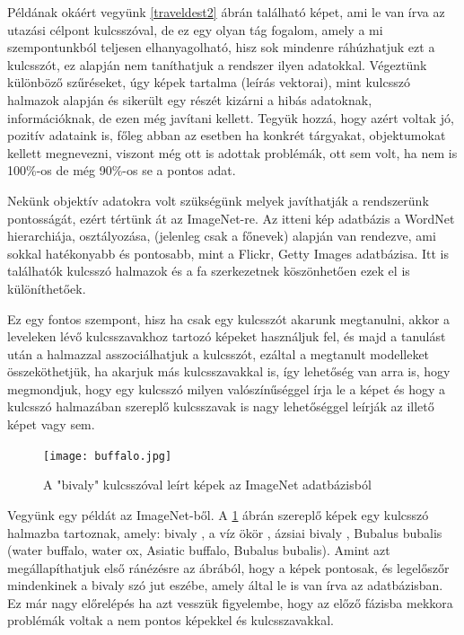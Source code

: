 \documentclass[12pt, a4paper, oneside]{book}
\theoremstyle{tetel}
\begin{document}
	Példának okáért vegyünk \ref{traveldest2} ábrán található képet, ami le van írva az utazási célpont kulcsszóval, de ez egy olyan tág fogalom, amely a mi szempontunkból teljesen elhanyagolható, hisz sok mindenre ráhúzhatjuk ezt a kulcsszót, ez alapján nem taníthatjuk a rendszer ilyen adatokkal. Végeztünk különböző szűréseket, úgy képek tartalma (leírás vektorai), mint kulcsszó halmazok alapján és sikerült egy részét kizárni a hibás adatoknak, információknak, de ezen még javítani kellett. Tegyük hozzá, hogy azért voltak jó, pozitív adataink is, főleg abban az esetben ha konkrét tárgyakat, objektumokat kellett megnevezni, viszont még ott is adottak problémák, ott sem volt, ha nem is 100\%-os de még 90\%-os se a pontos adat.  

	Nekünk objektív adatokra volt szükségünk melyek javíthatják a rendszerünk pontosságát, ezért tértünk át az ImageNet-re\cite{3}. Az itteni kép adatbázis a WordNet \cite{15} hierarchiája, osztályozása, (jelenleg csak a főnevek) alapján van rendezve, ami sokkal hatékonyabb és pontosabb, mint a Flickr\cite{1}, Getty Images\cite{2} adatbázisa. Itt is találhatók kulcsszó halmazok és a fa szerkezetnek köszönhetően ezek el is különíthetőek. 

	Ez egy fontos szempont, hisz ha csak egy kulcsszót akarunk megtanulni, akkor a leveleken lévő kulcsszavakhoz tartozó képeket használjuk fel, és majd a tanulást után a halmazzal asszociálhatjuk a kulcsszót, ezáltal a megtanult modelleket összeköthetjük, ha akarjuk más kulcsszavakkal is, így lehetőség van arra is, hogy megmondjuk, hogy egy kulcsszó milyen valószínűséggel írja le a képet és hogy a kulcsszó halmazában szereplő kulcsszavak is nagy lehetőséggel leírják az illető képet vagy sem.

\vspace{0.4cm}
\begin{figure}[h]
\begin{center}
\texttt{[image: buffalo.jpg]}
\caption{{A "bivaly" kulcsszóval leírt képek az ImageNet\cite{3} adatbázisból}}
\label{buffalo}
\end{center}
\end{figure}

	Vegyünk egy példát az ImageNet-ből\cite{3}. A \ref{buffalo} ábrán szereplő képek egy kulcsszó halmazba tartoznak, amely: bivaly , a víz ökör , ázsiai bivaly , Bubalus bubalis (water buffalo, water ox, Asiatic buffalo, Bubalus bubalis). Amint azt megállapíthatjuk első ránézésre az ábrából, hogy a képek pontosak, és legelőszőr mindenkinek a bivaly szó jut eszébe, amely által le is van írva az adatbázisban. Ez már nagy előrelépés ha azt vesszük figyelembe, hogy az előző fázisba mekkora problémák voltak a nem pontos képekkel és kulcsszavakkal. 
\end{document}
